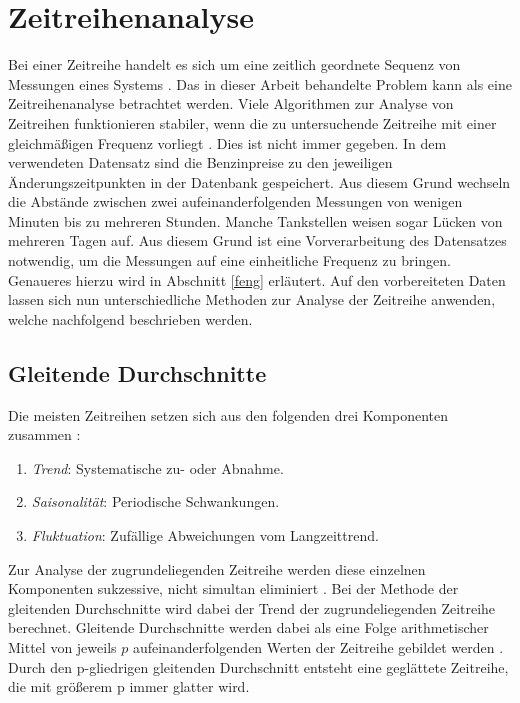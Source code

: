 \documentclass[
ngerman          %
,a4paper          %
,11pt
,pdftex
]{report}
\begin{document}
\section{Zeitreihenanalyse}
Bei einer Zeitreihe handelt es sich um eine zeitlich geordnete Sequenz von Messungen eines Systems \cite[145]{thinkstats}. Das in dieser Arbeit behandelte Problem kann als eine Zeitreihenanalyse betrachtet werden. Viele Algorithmen zur Analyse von Zeitreihen funktionieren stabiler, wenn die zu untersuchende Zeitreihe mit einer gleichmäßigen Frequenz vorliegt \cite[146]{thinkstats}. Dies ist nicht immer gegeben. In dem verwendeten Datensatz sind die Benzinpreise zu den jeweiligen Änderungszeitpunkten in der Datenbank gespeichert. Aus diesem Grund wechseln die Abstände zwischen zwei aufeinanderfolgenden Messungen von wenigen Minuten bis zu mehreren Stunden. Manche Tankstellen weisen sogar Lücken von mehreren Tagen auf. Aus diesem Grund ist eine Vorverarbeitung des Datensatzes notwendig, um die Messungen auf eine einheitliche Frequenz zu bringen. Genaueres hierzu wird in Abschnitt \ref{feng} erläutert. Auf den vorbereiteten Daten lassen sich nun unterschiedliche Methoden zur Analyse der Zeitreihe anwenden, welche nachfolgend beschrieben werden.

\subsection{Gleitende Durchschnitte}
Die meisten Zeitreihen setzen sich aus den folgenden drei Komponenten zusammen \cite[151]{thinkstats}:

\begin{enumerate}
	\item \textit{Trend}: Systematische zu- oder Abnahme.
	\item \textit{Saisonalität}: Periodische Schwankungen.
	\item \textit{Fluktuation}: Zufällige Abweichungen vom Langzeittrend.
\end{enumerate}
Zur Analyse der zugrundeliegenden Zeitreihe werden diese einzelnen Komponenten sukzessive, nicht simultan eliminiert \cite[397]{lippe}. Bei der Methode der gleitenden Durchschnitte wird dabei der Trend der zugrundeliegenden Zeitreihe berechnet. Gleitende Durchschnitte werden dabei als eine Folge arithmetischer Mittel von jeweils $p$ aufeinanderfolgenden Werten der Zeitreihe gebildet werden \cite[403]{lippe}. Durch den p-gliedrigen gleitenden Durchschnitt entsteht eine geglättete Zeitreihe, die mit größerem p immer glatter wird. 
\end{document}
